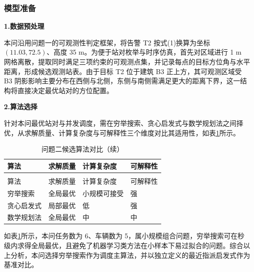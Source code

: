 
\subsubsection{模型准备}

\textbf{1.数据预处理}

本问沿用问题一的可观测性判定框架，将告警 T2 按式(1)换算为坐标 $(11.03,72.5)$、高度 35 m。为便于站对枚举与时序仿真，首先对区域进行 1 m 网格离散，提取同时满足三项约束的可观测点集，并记录每点的目标方位角与水平距离，形成候选观测站表。由于目标 T2 位于建筑 B3 正上方，其可观测区域受 B3 阴影影响主要分布在西侧与北侧，东侧与南侧需满足更大的距离下界，这一结构将直接决定最优站对的方位配置。

\textbf{2.算法选择}

针对本问最优站对与并发调度，需在穷举搜索、贪心启发式与数学规划法之间择优，从求解质量、计算复杂度与可解释性三个维度对比其适用性，如表\ref{tab:algo2}所示。

\begin{longtable}{>{\centering\arraybackslash}p{}>{\centering\arraybackslash}p{}>{\centering\arraybackslash}p{}>{\centering\arraybackslash}p{}}
  \caption{问题二候选算法对比}
  \label{tab:algo2} \\
  \toprule
  算法 & 求解质量 & 计算复杂度 & 可解释性 \\
  \midrule
  \endfirsthead
  \caption{问题二候选算法对比（续）} \\
  \toprule
  算法 & 求解质量 & 计算复杂度 & 可解释性 \\
  \midrule
  \endhead
  \bottomrule
  \endfoot
  穷举搜索 & 全局最优 & 小规模可接受 & 强 \\
  贪心启发式 & 局部最优 & 低 & 强 \\
  数学规划法 & 全局最优 & 中 & 中 \\
\end{longtable}

如表\ref{tab:algo2}所示，本问任务数为 6、车辆数为 5，属小规模组合问题，穷举搜索可在秒级内求得全局最优，且避免了机器学习类方法在小样本下易过拟合的问题\cite{zhou2016jiqi}。综合以上分析，本问选择穷举搜索作为调度主算法，并以独立定义的最近指派启发式作为基准对比。
